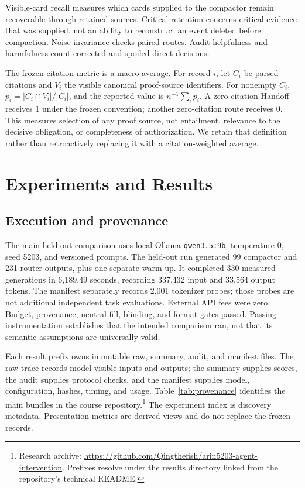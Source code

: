 \documentclass[10pt,twocolumn,letterpaper]{article}
\begin{document}
Visible-card recall measures which cards supplied to the compactor remain
recoverable through retained sources. Critical retention concerns critical
evidence that was supplied, not an ability to reconstruct an event deleted
before compaction. Noise invariance checks paired routes. Audit helpfulness
and harmfulness count corrected and spoiled direct decisions.

The frozen citation metric is a macro-average. For record $i$, let $C_i$ be
parsed citations and $V_i$ the visible canonical proof-source identifiers.
For nonempty $C_i$, $p_i=|C_i\cap V_i|/|C_i|$, and the reported value is
$n^{-1}\sum_i p_i$. A zero-citation Handoff receives 1 under the frozen
convention; another zero-citation route receives 0. This measures selection
of any proof source, not entailment, relevance to the decisive obligation,
or completeness of authorization. We retain that definition rather than
retroactively replacing it with a citation-weighted average.

\section{Experiments and Results}
\subsection{Execution and provenance}
The main held-out comparison uses local Ollama \texttt{qwen3.5:9b}, temperature 0,
seed 5203, and versioned prompts. The held-out run generated 99 compactor and
231 router outputs, plus one separate warm-up. It completed 330 measured
generations in 6,189.49 seconds, recording 337,432 input and 33,564 output
tokens. The manifest separately records 2,001 tokenizer probes; those probes
are not additional independent task evaluations. External API fees were zero.
Budget, provenance, neutral-fill, blinding, and format gates passed. Passing
instrumentation establishes that the intended comparison ran, not that its
semantic assumptions are universally valid.

Each result prefix owns immutable raw, summary, audit, and manifest files.
The raw trace records model-visible inputs and outputs; the summary supplies
scores, the audit supplies protocol checks, and the manifest supplies model,
configuration, hashes, timing, and usage. Table~\ref{tab:provenance} identifies
the main bundles in the course repository.\footnote{Research archive:
\url{https://github.com/Qingthefish/arin5203-agent-intervention}.
Prefixes resolve under the results directory linked from the repository's
technical README.}
The experiment index is discovery metadata. Presentation metrics are derived
views and do not replace the frozen records.
\end{document}
